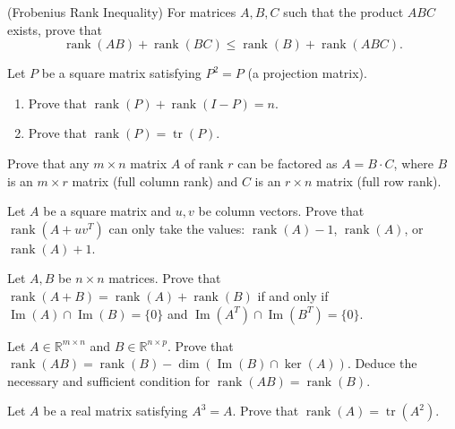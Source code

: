 \documentclass[12pt]{article}
\begin{document}
\begin{problem}
(Frobenius Rank Inequality) For matrices $A,B,C$ such that the product $ABC$ exists, prove that
\[
\operatorname{rank}(AB)+\operatorname{rank}(BC) \le \operatorname{rank}(B)+\operatorname{rank}(ABC).
\]
\end{problem}

\begin{problem}
Let $P$ be a square matrix satisfying $P^2=P$ (a projection matrix).
\begin{enumerate}[label=(\alph*)]
\item Prove that $\operatorname{rank}(P)+\operatorname{rank}(I-P)=n$.
\item Prove that $\operatorname{rank}(P)=\operatorname{tr}(P)$.
\end{enumerate}
\end{problem}

\begin{problem}
Prove that any $m\times n$ matrix $A$ of rank $r$ can be factored as $A=B\cdot C$, where $B$ is an $m\times r$ matrix (full column rank) and $C$ is an $r\times n$ matrix (full row rank).
\end{problem}

\begin{problem}
Let $A$ be a square matrix and $u,v$ be column vectors. Prove that $\operatorname{rank}(A+uv^T)$ can only take the values: $\operatorname{rank}(A)-1$, $\operatorname{rank}(A)$, or $\operatorname{rank}(A)+1$.
\end{problem}

\begin{problem}
Let $A,B$ be $n\times n$ matrices. Prove that $\operatorname{rank}(A+B)=\operatorname{rank}(A)+\operatorname{rank}(B)$ if and only if $\operatorname{Im}(A)\cap \operatorname{Im}(B)=\{0\}$ and $\operatorname{Im}(A^T)\cap \operatorname{Im}(B^T)=\{0\}$.
\end{problem}

\begin{problem}
Let $A\in\mathbb{R}^{m\times n}$ and $B\in\mathbb{R}^{n\times p}$. Prove that $\operatorname{rank}(AB)=\operatorname{rank}(B)-\dim(\operatorname{Im}(B)\cap \ker(A))$. Deduce the necessary and sufficient condition for $\operatorname{rank}(AB)=\operatorname{rank}(B)$.
\end{problem}

\begin{problem}
Let $A$ be a real matrix satisfying $A^3=A$. Prove that $\operatorname{rank}(A)=\operatorname{tr}(A^2)$.
\end{problem}
\end{document}
